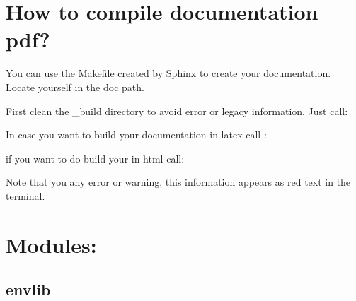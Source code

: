 \documentclass[a4paper,11pt,english]{sphinxmanual}
\begin{document}
\begin{sphinxVerbatim}[commandchars=\\\{\}]
\end{sphinxVerbatim}


\chapter{How to compile documentation pdf?}
\label{\detokenize{index:how-to-compile-documentation-pdf}}
\sphinxAtStartPar
You can use the Makefile created by Sphinx to create your documentation. Locate yourself in the doc path.

\sphinxAtStartPar
First clean the \_build directory to avoid error or legacy information. Just call:

\begin{sphinxVerbatim}[commandchars=\\\{\}]
 
\end{sphinxVerbatim}

\sphinxAtStartPar
In case you want to build your documentation in latex call :

\begin{sphinxVerbatim}[commandchars=\\\{\}]
 
\end{sphinxVerbatim}

\sphinxAtStartPar
if you want to do build your in html call:

\begin{sphinxVerbatim}[commandchars=\\\{\}]
 
\end{sphinxVerbatim}

\sphinxAtStartPar
Note that you  any error or warning, this information appears as red text in the terminal.


\chapter{Modules:}
\label{\detokenize{index:modules}}

\section{envlib}
\label{\detokenize{modules:envlib}}\label{\detokenize{modules::doc}}
\end{document}
